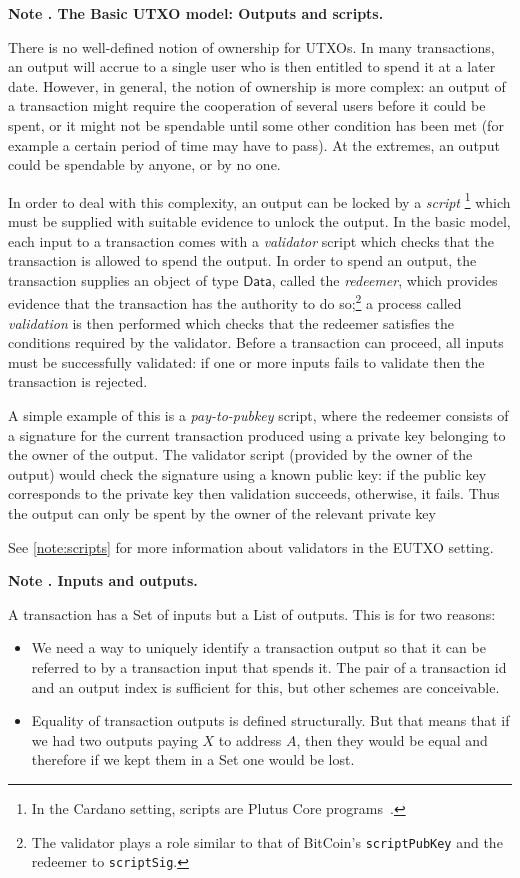 \documentclass[a4paper]{article}
\newcounter{note}
\newcommand{\note}[1]{
  \bigskip
  \refstepcounter{note}
  \noindent\textbf{Note \thenote. #1}
}
\renewcommand{\i}{\textit}  %
\newcommand{\s}{\textsf}  %
\newcommand{\Data}{\ensuremath{\s{Data}}}
\begin{document}
\note{The Basic UTXO model: Outputs and scripts.}
\label{note:basic-utxo}
There is no well-defined notion of ownership for UTXOs.  In many
transactions, an output will accrue to a single user who is then
entitled to spend it at a later date.  However, in general, the notion
of ownership is more complex: an output of a transaction might require
the cooperation of several users before it could be spent, or it might
not be spendable until some other condition has been met (for example
a certain period of time may have to pass).  At the extremes, an
output could be spendable by anyone, or by no one.

In order to deal with this complexity, an output can be locked by a
\textit{script}%
\footnote{In the Cardano setting, scripts are Plutus Core
  programs~\citep{Plutus-Core-spec}.}
which must be supplied with suitable evidence to unlock the output.
In the basic model, each input to a transaction comes with a
\i{validator} script which checks that the transaction is allowed to
spend the output.  In order to spend an output, the transaction
supplies an object of type $\Data$, called the \i{redeemer}, which provides
evidence that the transaction has the authority to do so;\footnote{The
  validator plays a role similar to that of BitCoin's
  \texttt{scriptPubKey} and the redeemer to \texttt{scriptSig}.
} a process called \i{validation} is then performed which checks that
the redeemer satisfies the conditions required by the validator.
Before a transaction can proceed, all inputs must be successfully
validated: if one or more inputs fails to validate then the
transaction is rejected.

A simple example of this is a \i{pay-to-pubkey} script, where the
redeemer consists of a signature for the current transaction produced
using a private key belonging to the owner of the output.  The
validator script (provided by the owner of the output) would check the
signature using a known public key: if the public key corresponds to
the private key then validation succeeds, otherwise, it fails.  Thus
the output can only be spent by the owner of the relevant private key

See \cref{note:scripts} for more information about validators in
the EUTXO setting.

\note{Inputs and outputs.}
\label{note:inputs-and-outputs}
A transaction has a \textsf{Set} of inputs but a \textsf{List} of outputs.
This is for two reasons:
\begin{itemize}
  \item We need a way to uniquely identify a transaction output so
  that it can be referred to by a transaction input that spends it. The pair of
  a transaction id and an output index is sufficient for this, but other schemes
  are conceivable.
  \item Equality of transaction outputs is defined structurally. But that means
    that if we had two outputs paying $X$ to address $A$, then they would be
    equal and therefore if we kept them in a \s{Set} one would be lost.
\end{itemize}
\end{document}
